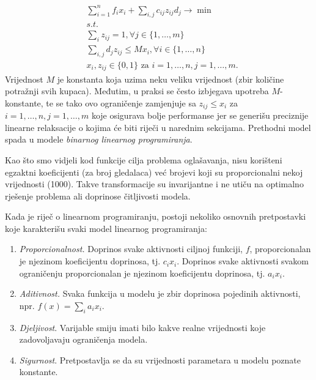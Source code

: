 \documentclass[a4paper, utf8, 11pt, colorlinks]{article}
\begin{document}
\begin{align*}
     &\sum_{i=1}^n f_i x_i  + \sum_{i,j} c_{ij} z_{ij} d_j \rightarrow \min\\
     & s.t. \nonumber \\
     & \sum_{i} z_{ij} = 1, \forall j\in\{1,\ldots,m\} \\
     & \sum_{i,j} d_j z_{ij} \leq M x_i, \forall i \in \{1,\ldots,n\} \\
     & x_i, z_{ij} \in \{0,1\} \mbox{ za } i = 1, \ldots, n, j = 1,  \ldots, m.
\end{align*}
Vrijednost $M$ je konstanta koja uzima neku veliku vrijednost (zbir količine potražnji svih kupaca). Međutim, u praksi se često izbjegava upotreba $M$-konstante, te se tako ovo ograničenje zamjenjuje sa $ z_{ij} \leq x_i$ 
za $ i = 1, \ldots, n, j = 1,  \ldots, m$ koje osigurava bolje performanse jer se generišu preciznije linearne relaksacije o kojima će biti riječi u narednim sekcijama. Prethodni model spada u modele \emph{binarnog linearnog programiranja}. 

Kao što smo vidjeli kod funkcije cilja problema oglašavanja,  
nisu korišteni egzaktni koeficijenti (za broj gledalaca) već brojevi koji su proporcionalni nekoj vrijednosti (1000). Takve transformacije su invarijantne i ne utiču na optimalno rješenje problema ali doprinose čitljivosti modela.
 
Kada je riječ o linearnom programiranju,  postoji nekoliko osnovnih pretpostavki koje karakterišu svaki model  linearnog programiranja:
\begin{enumerate}
    \item \emph{Proporcionalnost.} Doprinos svake aktivnosti ciljnoj funkciji, $f$, proporcionalan je njezinom koeficijentu doprinosa, tj. $c_ix_i$. Doprinos svake aktivnosti svakom   ograničenju proporcionalan je njezinom  koeficijentu doprinosa, tj. $a_ix_i$.
    \item  \emph{Aditivnost.} Svaka funkcija u modelu je zbir  doprinosa pojedinih aktivnosti, npr. $f(x) = \sum_i a_i x_i$.
    \item \emph{Djeljivost}. Varijable   smiju imati bilo kakve realne vrijednosti koje zadovoljavaju ograničenja modela.
    \item \emph{Sigurnost}. Pretpostavlja se da su vrijednosti parametara u modelu poznate konstante. 
\end{enumerate}
\end{document}

